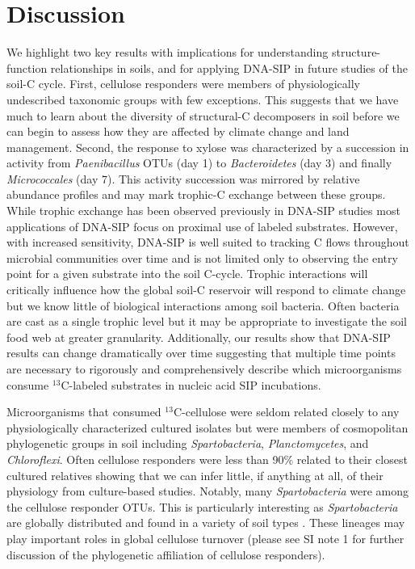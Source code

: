 \section{Discussion} 
We highlight two key results with implications for understanding structure-function
relationships in soils, and for applying DNA-SIP in future studies of the soil-C
cycle. First, cellulose responders were members of physiologically undescribed
taxonomic groups with few exceptions. This suggests that we have much to learn
about the diversity of structural-C decomposers in soil before we can begin to
assess how they are affected by climate change and land management. Second, the
response to xylose was characterized by a succession in activity from
\textit{Paenibacillus} OTUs (day 1) to \textit{Bacteroidetes} (day 3) and finally
\textit{Micrococcales} (day 7). This activity succession was mirrored by relative
abundance profiles and may mark trophic-C exchange between these groups. While
trophic exchange has been observed previously in DNA-SIP studies
\citep{lueders2004b} most applications of DNA-SIP focus on proximal use of
labeled substrates. However, with increased sensitivity, DNA-SIP is well suited
to tracking C flows throughout microbial communities over time and is not
limited only to observing the entry point for a given substrate into the soil
C-cycle.  Trophic interactions will critically influence how the global soil-C
reservoir will respond to climate change \citep{Crowther2015} but we know
little of biological interactions among soil bacteria. Often bacteria are cast
as a single trophic level \citep{Moore1988} but it may be appropriate to
investigate the soil food web at greater granularity. Additionally, our results
show that DNA-SIP results can change dramatically over time suggesting that
multiple time points are necessary to rigorously and comprehensively describe
which microorganisms consume $^{13}$C-labeled substrates in nucleic acid SIP
incubations.

Microorganisms that consumed $^{13}$C-cellulose were seldom related closely to any
physiologically characterized cultured isolates but were members of
cosmopolitan phylogenetic groups in soil including \textit{Spartobacteria},
\textit{Planctomycetes}, and \textit{Chloroflexi}. Often cellulose responders
were less than 90\% related to their closest cultured relatives showing that we
can infer little, if anything at all, of their physiology from culture-based
studies. Notably, many \textit{Spartobacteria} were among the cellulose responder OTUs.
This is particularly interesting as \textit{Spartobacteria} are globally
distributed and found in a variety of soil types \citep{Bergmann_2011}. These lineages may play
important roles in global cellulose turnover (please see SI note 1 for further
discussion of the phylogenetic affiliation of cellulose responders). 

